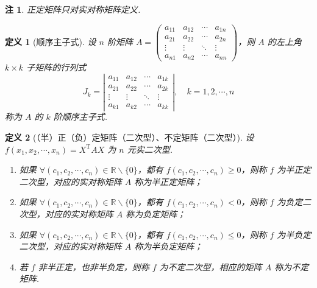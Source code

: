 \documentclass[zihao=-4,UTF8,linespread=1.8,nothm]{aytony_base}
\newtheorem{definition}{\indent 定义}[subsection]
\newtheorem*{remark}{\indent 注}
\begin{document}
\begin{remark}
    正定矩阵只对实对称矩阵定义.
\end{remark}

\begin{definition}[顺序主子式]
    设 $n$ 阶矩阵 $A = \left(
        \begin{matrix}
                a_{11} & a_{12} & \cdots & a_{1n} \\
                a_{21} & a_{22} & \cdots & a_{2n} \\
                \vdots &
                \vdots &
                \ddots &
                \vdots                            \\
                a_{n1} & a_{n2} & \cdots & a_{nn}
            \end{matrix}
        \right)$，则 $A$ 的左上角 $k \times k$ 子矩阵的行列式 $$
        J_k = \left|
        \begin{matrix}
            a_{11} & a_{12} & \cdots & a_{1k} \\
            a_{21} & a_{22} & \cdots & a_{2k} \\
            \vdots &
            \vdots &
            \ddots &
            \vdots                            \\
            a_{k1} & a_{k2} & \cdots & a_{kk}
        \end{matrix}
        \right|,\quad k = 1, 2, \cdots, n
    $$ 称为 $A$ 的 $k$ 阶顺序主子式.
\end{definition}

\begin{definition}[（半）正（负）定矩阵（二次型）、不定矩阵（二次型）]
    设 $f(x_1, x_2, \cdots, x_n) = X ^{\mathrm{T}}AX$ 为 $n$ 元实二次型.
    \begin{enumerate}[nosep]
        \item 如果 $\forall ({c}_1, {c}_2, \cdots, {c}_{n}) \in \mathbb{R}\backslash \{0\}$，都有 $f({c}_1, {c}_2, \cdots, {c}_{n}) \geqslant 0$，则称 $f$ 为半正定二次型，对应的实对称矩阵 $A$ 称为半正定矩阵；
        \item 如果 $\forall ({c}_1, {c}_2, \cdots, {c}_{n}) \in \mathbb{R}\backslash \{0\}$，都有 $f({c}_1, {c}_2, \cdots, {c}_{n}) < 0$，则称 $f$ 为负定二次型，对应的实对称矩阵 $A$ 称为负定矩阵；
        \item 如果 $\forall ({c}_1, {c}_2, \cdots, {c}_{n}) \in \mathbb{R}\backslash \{0\}$，都有 $f({c}_1, {c}_2, \cdots, {c}_{n}) \leqslant 0$，则称 $f$ 为半负定二次型，对应的实对称矩阵 $A$ 称为半负定矩阵；
        \item 若 $f$ 非半正定，也非半负定，则称 $f$ 为不定二次型，相应的矩阵 $A$ 称为不定矩阵.
    \end{enumerate}
\end{definition}
\end{document}
